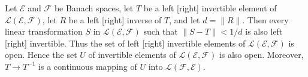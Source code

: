 Let $\mathcal{E}$ and $\mathcal{F}$ be Banach spaces, let $T$ be a left [right] invertible element of $\mathcal{L}(\mathcal{E}, \mathcal{F})$, let $R$ be a left [right] inverse of $T$, and let $d = \| R \|$. Then every linear transformation $S$ in $\mathcal{L}(\mathcal{E}, \mathcal{F})$ such that $\| S - T \| < 1/d$ is also left [right] invertible. Thus the set of left [right] invertible elements of $\mathcal{L}(\mathcal{E}, \mathcal{F})$ is open. Hence the set $U$ of invertible elements of $\mathcal{L}(\mathcal{E}, \mathcal{F})$ is also open. Moreover, $T \rightarrow T^{-1}$ is a continuous mapping of $U$ into $\mathcal{L}(\mathcal{F}, \mathcal{E})$.
